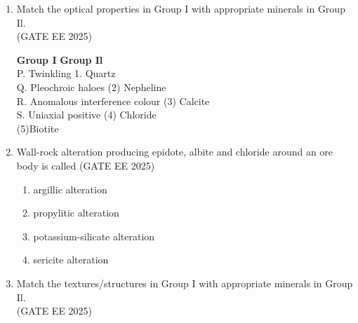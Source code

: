 \documentclass[journal]{IEEEtran}
\begin{document}
\begin{enumerate}[start=1]
\item Match the optical properties  in Group I with appropriate minerals in Group Il.\\\hfill{(GATE EE 2025)}

\vspace{0.5cm}
\textbf{Group I} \hspace{6cm}
\textbf{Group Il}\\
P. Twinkling \qquad \qquad \qquad \qquad \hspace{2.7cm}1. Quartz\\
Q. Pleochroic haloes \qquad \qquad \qquad \qquad \hspace{1.4cm}       (2) Nepheline\\
R. Anomalous interference colour \qquad \qquad \qquad \quad (3) Calcite\\
S. Uniaxial positive \quad \qquad \qquad \qquad  \hspace{1.9cm}           (4) Chloride\\\hspace*{7.4cm}(5)Biotite
\begin{enumerate}
\end{enumerate}

\item Wall-rock alteration producing epidote, albite and chloride around an ore body is called \hfill{(GATE EE 2025)}
\begin{enumerate}
    \item argillic alteration
    \item propylitic alteration
    \item potassium-silicate alteration
    \item sericite alteration
\end{enumerate}

\item Match the textures/structures  in Group I with appropriate minerals in Group Il.\\\hfill{(GATE EE 2025)}


\end{enumerate}
\end{document}
